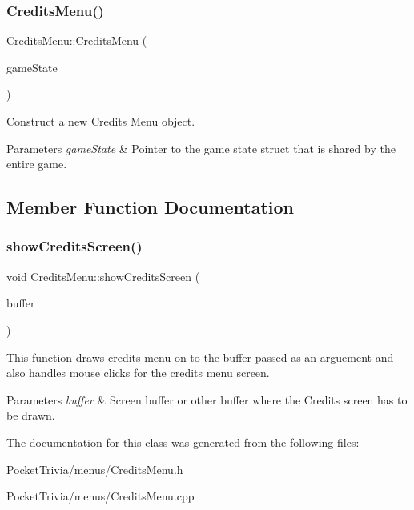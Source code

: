 \subsubsection{\texorpdfstring{CreditsMenu()}{CreditsMenu()}}
{\footnotesize\ttfamily Credits\+Menu\+::\+Credits\+Menu (\begin{DoxyParamCaption}\item[{\mbox{\hyperlink{struct_game_state}{Game\+State}} $\ast$}]{game\+State }\end{DoxyParamCaption})}



Construct a new Credits Menu object. 


\begin{DoxyParams}{Parameters}
{\em game\+State} & Pointer to the game state struct that is shared by the entire game. \\
\hline
\end{DoxyParams}


\subsection{Member Function Documentation}
\mbox{\label{class_credits_menu_a11a0ae472348a21828d972ad0966203b}} 
\subsubsection{\texorpdfstring{showCreditsScreen()}{showCreditsScreen()}}
{\footnotesize\ttfamily void Credits\+Menu\+::show\+Credits\+Screen (\begin{DoxyParamCaption}\item[{B\+I\+T\+M\+AP $\ast$}]{buffer }\end{DoxyParamCaption})}



This function draws credits menu on to the buffer passed as an arguement and also handles mouse clicks for the credits menu screen. 


\begin{DoxyParams}{Parameters}
{\em buffer} & Screen buffer or other buffer where the Credits screen has to be drawn. \\
\hline
\end{DoxyParams}


The documentation for this class was generated from the following files\+:\begin{DoxyCompactItemize}
\item 
Pocket\+Trivia/menus/Credits\+Menu.\+h\item 
Pocket\+Trivia/menus/Credits\+Menu.\+cpp\end{DoxyCompactItemize}
